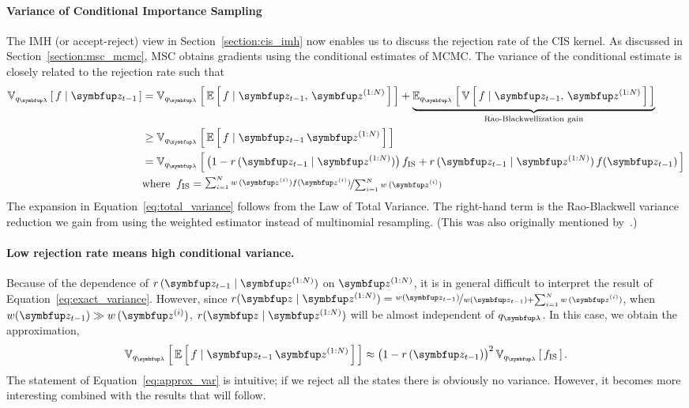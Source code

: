 \paragraph{Variance of Conditional Importance Sampling}
The IMH (or accept-reject) view in Section~\ref{section:cis_imh} now enables us to discuss the rejection rate of the CIS kernel.
As discussed in Section~\ref{section:msc_mcmc}, MSC obtains gradients using the conditional estimates of MCMC.
The variance of the conditional estimate is closely related to the rejection rate such that
\begin{align}
  \Vsub{q_{\vlambda}}{f \mid \vz_{t-1}} &= \Vsub{q_{\vlambda}}{ \E{ f \mid \vz_{t-1},\,\vz^{(1:N)} } } + \underbrace{\Esub{q_{\vlambda}}{ \V{ f \mid \vz_{t-1},\,\vz^{(1:N)} } }}_{\text{Rao-Blackwellization gain}} \label{eq:total_variance} \\
  &\geq \Vsub{q_{\vlambda}}{ \E{ f \mid \vz_{t-1}\,\vz^{(1:N)} } } \\
  &= \Vsub{q_{\vlambda}}{ \big(1 - r\,(\vz_{t-1}\mid\vz^{(1:N)})\big)\, f_{\mathrm{IS}}
    + r\,(\vz_{t-1}\mid\vz^{(1:N)})\,f(\vz_{t-1})  } \label{eq:exact_variance} \\
  &\text{where}\;\; f_{\mathrm{IS}} = \nicefrac{\sum_{i=1}^N w\,(\vz^{(i)}) f(\vz^{(i)})}{\sum_{i=1}^N w\,(\vz^{(i)})} \nonumber 
\end{align}
%
The expansion in Equation~\eqref{eq:total_variance} follows from the Law of Total Variance.
The right-hand term is the Rao-Blackwell variance reduction we gain from using the weighted estimator instead of multinomial resampling. (This was also originally mentioned by~\citet{NEURIPS2020_b2070693}.)

\paragraph{Low rejection rate means high conditional variance.}
Because of the dependence of \(r\,(\vz_{t-1}\mid\vz^{(1:N)})\) on \(\vz^{(1:N)}\), it is in general difficult to interpret the result of Equation~\eqref{eq:exact_variance}.
However, since \(r(\vz\mid\vz^{(1:N)}) = \nicefrac{w(\vz_{t-1})}{w(\vz_{t-1}) + \sum_{i=1}^N w\,(\vz^{(i)})}\), when \(w(\vz_{t-1}) \gg w\,(\vz^{(i)})\), \(r(\vz\mid\vz^{(1:N)})\) will be almost independent of \(q_{\vlambda}\).
In this case, we obtain the approximation,
\begin{align}
  \Vsub{q_{\vlambda}}{ \E{ f \mid \vz_{t-1}\,\vz^{(1:N)} } } \approx {\big(1 - r\,(\vz_{t-1})\big)}^2\,\Vsub{q_{\vlambda}}{ f_{\text{IS}} }.\label{eq:approx_var}
\end{align}
The statement of Equation~\eqref{eq:approx_var} is intuitive; if we reject all the states there is obviously no variance.
However, it becomes more interesting combined with the results that will follow.

